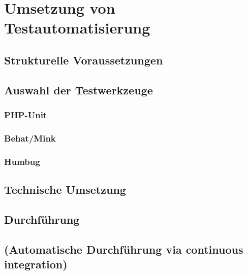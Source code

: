 \newpage
\section{Umsetzung von Testautomatisierung}

\subsection{Strukturelle Voraussetzungen}

\subsection{Auswahl der Testwerkzeuge}
\subsubsection{PHP-Unit}
\subsubsection{Behat/Mink}
\subsubsection{Humbug}


\subsection{Technische Umsetzung}


\subsection{Durchführung}

\subsection{(Automatische Durchführung via continuous integration)}